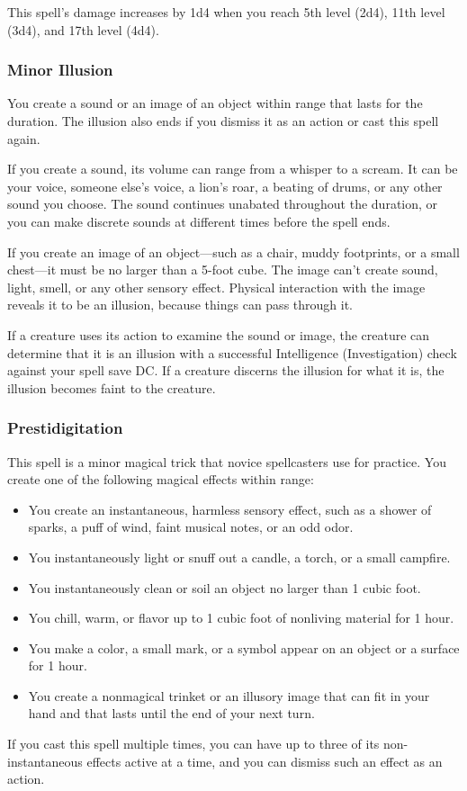 \documentclass[11pt]{article}
\begin{document}
This spell's damage increases by 1d4 when you reach 5th level (2d4), 11th level (3d4), and 17th level (4d4).
\subsubsection{Minor Illusion}
\label{sec:org6637df8}
You create a sound or an image of an object within range that lasts for the duration. The illusion also ends if you dismiss it as an action or cast this spell again.

If you create a sound, its volume can range from a whisper to a scream. It can be your voice, someone else's voice, a lion's roar, a beating of drums, or any other sound you choose. The sound continues unabated throughout the duration, or you can make discrete sounds at different times before the spell ends.

If you create an image of an object—such as a chair, muddy footprints, or a small chest—it must be no larger than a 5-foot cube. The image can't create sound, light, smell, or any other sensory effect. Physical interaction with the image reveals it to be an illusion, because things can pass through it.

If a creature uses its action to examine the sound or image, the creature can determine that it is an illusion with a successful Intelligence (Investigation) check against your spell save DC. If a creature discerns the illusion for what it is, the illusion becomes faint to the creature.
\subsubsection{Prestidigitation}
\label{sec:org3eff059}
This spell is a minor magical trick that novice spellcasters use for practice. You create one of the following magical effects within range:
\begin{itemize}
\item You create an instantaneous, harmless sensory effect, such as a shower of sparks, a puff of wind, faint musical notes, or an odd odor.
\item You instantaneously light or snuff out a candle, a torch, or a small campfire.
\item You instantaneously clean or soil an object no larger than 1 cubic foot.
\item You chill, warm, or flavor up to 1 cubic foot of nonliving material for 1 hour.
\item You make a color, a small mark, or a symbol appear on an object or a surface for 1 hour.
\item You create a nonmagical trinket or an illusory image that can fit in your hand and that lasts until the end of your next turn.
\end{itemize}
If you cast this spell multiple times, you can have up to three of its non-instantaneous effects active at a time, and you can dismiss such an effect as an action.
\end{document}
